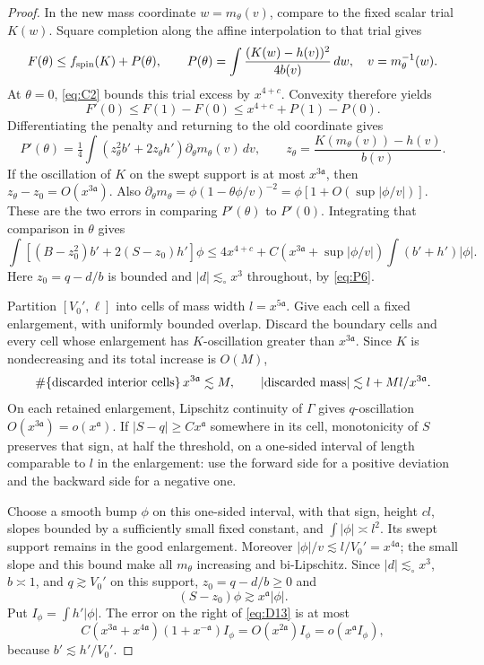 \begin{proof}
In the new mass coordinate $w=m_\theta(v)$, compare to the fixed scalar
trial $K(w)$.  Square completion along the affine interpolation to that
trial gives
\[
 F(\theta)\le f_{\rm spin}(K)+P(\theta),\qquad
 P(\theta)=\int\frac{(K(w)-h(v))^2}{4b(v)}\,dw,
       \quad v=m_\theta^{-1}(w).
\]
At $\theta=0$, \eqref{eq:C2} bounds this trial excess by $x^{4+c}$.
Convexity therefore yields
\[
 F'(0)\le F(1)-F(0)
       \le x^{4+c}+P(1)-P(0).
\]
Differentiating the penalty and returning to the old coordinate gives
\begin{equation*}
 P'(\theta)=\tfrac14\int(z_\theta^2b'+2z_\theta h')
                    \partial_\theta m_\theta(v)\,dv,
 \qquad z_\theta=\frac{K(m_\theta(v))-h(v)}{b(v)}.
\end{equation*}
If the oscillation of $K$ on the swept support is at most
$x^{3\mathfrak a}$, then $z_\theta-z_0=O(x^{3\mathfrak a})$.
Also
$\partial_\theta m_\theta=\phi(1-\theta\phi/v)^{-2}
=\phi[1+O(\sup|\phi/v|)]$.
These are the two errors in comparing $P'(\theta)$ to $P'(0)$.
Integrating that comparison in $\theta$ gives
\begin{equation}
\int [(B-z_0^2)b'+2(S-z_0)h']\phi
 \le 4x^{4+c}+C(x^{3\mathfrak a}+\sup|\phi/v|)\int(b'+h')|\phi|.       \tag{D13}\label{eq:D13}
\end{equation}
Here \(z_0=q-d/b\) is bounded and \(|d|\lesssim_\circ x^3\) throughout, by \eqref{eq:P6}.

Partition $[V_0',\ell]$ into cells of mass width
$l=x^{5\mathfrak a}$.  Give each cell a fixed enlargement, with
uniformly bounded overlap.  Discard the boundary cells and every cell
whose enlargement has $K$-oscillation greater than $x^{3\mathfrak a}$.
Since $K$ is nondecreasing and its total increase is $O(M)$,
\[
 \#\{\hbox{discarded interior cells}\}\,x^{3\mathfrak a}
       \lesssim M,
 \qquad
 |\hbox{discarded mass}|\lesssim l+Ml/x^{3\mathfrak a}.
\]
On each retained enlargement, Lipschitz continuity of $\Gamma$ gives
$q$-oscillation $O(x^{3\mathfrak a})=o(x^{\mathfrak a})$.
If $|S-q|\ge Cx^{\mathfrak a}$ somewhere in its cell, monotonicity
of $S$ preserves that sign, at half the threshold, on a one-sided
interval of length comparable to $l$ in the enlargement: use the
forward side for a positive deviation and the backward side for a
negative one.

Choose a smooth bump $\phi$ on this one-sided interval, with that sign,
height $cl$, slopes bounded by a sufficiently small fixed constant,
and $\int|\phi|\asymp l^2$.  Its swept support remains in the good
enlargement.  Moreover $|\phi|/v\lesssim l/V_0'=x^{4\mathfrak a}$;
the small slope and this bound make all $m_\theta$ increasing and
bi-Lipschitz.  Since $|d|\lesssim_\circ x^3$, $b\asymp1$, and
$q\gtrsim V_0'$ on this support, $z_0=q-d/b\ge0$ and
\[
 (S-z_0)\phi\gtrsim x^{\mathfrak a}|\phi|.
\]
Put $I_\phi=\int h'|\phi|$.  The error on the right of \eqref{eq:D13}
is at most
\[
 C(x^{3\mathfrak a}+x^{4\mathfrak a})(1+x^{-\mathfrak a})I_\phi
       =O(x^{2\mathfrak a})I_\phi
       =o(x^{\mathfrak a}I_\phi),
\]
because $b'\lesssim h'/V_0'$.


\end{proof}
